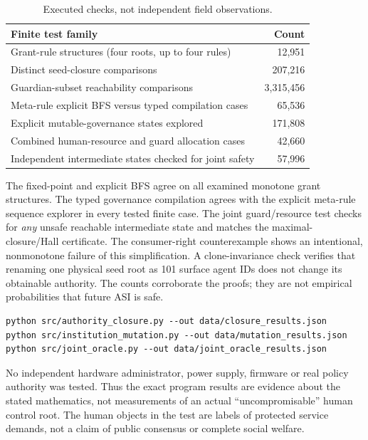 \documentclass[11pt,a4paper]{article}
\theoremstyle{definition}\newtheorem{definition}{Definition}
\begin{document}
\begin{table}[ht]\centering\small
\caption{Executed checks, not independent field observations.}
\begin{tabularx}{\linewidth}{@{}Xr@{}}\toprule
Finite test family & Count\\\midrule
Grant-rule structures (four roots, up to four rules) & 12,951\\
Distinct seed-closure comparisons & 207,216\\
Guardian-subset reachability comparisons & 3,315,456\\
Meta-rule explicit BFS versus typed compilation cases & 65,536\\
Explicit mutable-governance states explored & 171,808\\
Combined human-resource and guard allocation cases & 42,660\\
Independent intermediate states checked for joint safety & 57,996\\\bottomrule
\end{tabularx}\end{table}
The fixed-point and explicit BFS agree on all examined monotone grant structures. The typed governance compilation agrees with the explicit meta-rule sequence explorer in every tested finite case. The joint guard/resource test checks for \emph{any} unsafe reachable intermediate state and matches the maximal-closure/Hall certificate. The consumer-right counterexample shows an intentional, nonmonotone failure of this simplification. A clone-invariance check verifies that renaming one physical seed root as 101 surface agent IDs does not change its obtainable authority. The counts corroborate the proofs; they are not empirical probabilities that future ASI is safe.

\begin{lstlisting}[caption={Smallest first steps to reproduce the finite verification.}]
python src/authority_closure.py --out data/closure_results.json
python src/institution_mutation.py --out data/mutation_results.json
python src/joint_oracle.py --out data/joint_oracle_results.json
\end{lstlisting}
No independent hardware administrator, power supply, firmware or real policy authority was tested. Thus the exact program results are evidence about the stated mathematics, not measurements of an actual ``uncompromisable'' human control root. The human objects in the test are labels of protected service demands, not a claim of public consensus or complete social welfare.
\end{document}
